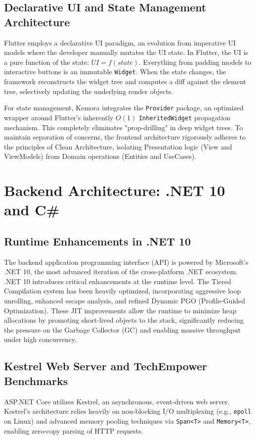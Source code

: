 \subsection{Declarative UI and State Management Architecture}
Flutter employs a declarative UI paradigm, an evolution from imperative UI models where the developer manually mutates the UI state. In Flutter, the UI is a pure function of the state: $UI = f(state)$. Everything from padding models to interactive buttons is an immutable \texttt{Widget}. When the state changes, the framework reconstructs the widget tree and computes a diff against the element tree, selectively updating the underlying render objects.

For state management, Kemora integrates the \texttt{Provider} package, an optimized wrapper around Flutter's inherently $O(1)$ \texttt{InheritedWidget} propagation mechanism. This completely eliminates "prop-drilling" in deep widget trees. To maintain separation of concerns, the frontend architecture rigorously adheres to the principles of Clean Architecture, isolating Presentation logic (View and ViewModels) from Domain operations (Entities and UseCases).

\section{Backend Architecture: .NET 10 and C\#}
\subsection{Runtime Enhancements in .NET 10}
The backend application programming interface (API) is powered by Microsoft's .NET 10, the most advanced iteration of the cross-platform .NET ecosystem. .NET 10 introduces critical enhancements at the runtime level. The Tiered Compilation system has been heavily optimized, incorporating aggressive loop unrolling, enhanced escape analysis, and refined Dynamic PGO (Profile-Guided Optimization). These JIT improvements allow the runtime to minimize heap allocations by promoting short-lived objects to the stack, significantly reducing the pressure on the Garbage Collector (GC) and enabling massive throughput under high concurrency.

\subsection{Kestrel Web Server and TechEmpower Benchmarks}
ASP.NET Core utilizes Kestrel, an asynchronous, event-driven web server. Kestrel's architecture relies heavily on non-blocking I/O multiplexing (e.g., \texttt{epoll} on Linux) and advanced memory pooling techniques via \texttt{Span<T>} and \texttt{Memory<T>}, enabling zero-copy parsing of HTTP requests. 

